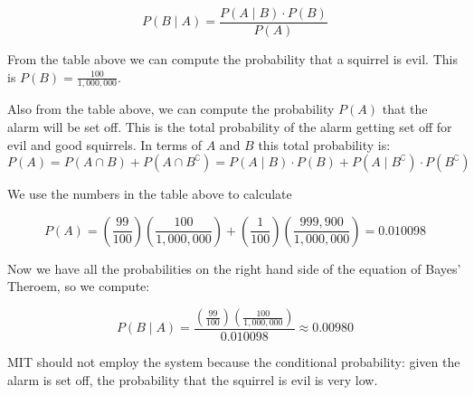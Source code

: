 \documentclass[a4paper,11pt]{article}
\begin{document}
\begin{equation}
  P \left( B \mid A \right) = 
    \frac{ P \left( A \mid B \right) \cdot P \left( B \right)}
      { P \left( A \right) }
\end{equation}

From the table above we can compute the probability that a squirrel is 
evil.  This is $P \left( B \right) = \frac{100}{1,000,000}$.

Also from the table above, we can compute the probability 
$P\left(A \right)$ that the alarm will be set off.  This is the total
probability of the alarm getting set off for evil and good squirrels. 
In terms of $A$ and $B$ this total probability is:
\begin{equation}
  P \left(A \right) 
  = P \left( A \cap B \right) + P \left( A \cap B^{\complement} \right)
  = P \left( A \mid B \right) \cdot P \left( B \right) +
      P \left( A \mid B^{\complement} \right) 
        \cdot P \left( B^{\complement} \right)
\end{equation}

We use the numbers in the table above to calculate

\begin{equation}
  P\left(A \right)
  = \left( \frac{99}{100} \right) \left( \frac{100}{1,000,000} \right)
      + \left( \frac{1}{100} \right) 
        \left( \frac{999,900}{1,000,000} \right) = 0.010098
\end{equation}

Now we have all the probabilities on the right hand side of the equation
of Bayes' Theroem, so we compute:

\begin{equation}
  P \left( B \mid A \right) = 
   \frac{\left( \frac{99}{100} \right) 
      \left( \frac{100}{1,000,000} \right)}
    {0.010098} \approx 0.00980
\end{equation}

MIT should not employ the system because the conditional probability:
given the alarm is set off, the probability that the squirrel is evil
is very low.

\printbibliography{}
\end{document}
